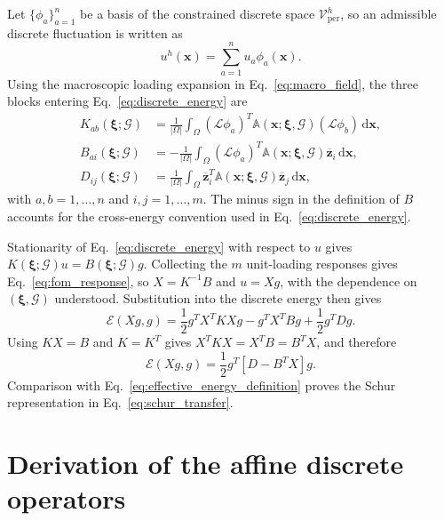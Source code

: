 \documentclass[pdflatex,sn-basic,Numbered]{sn-jnl}
\newcommand{\G}{\mathcal{G}}
\begin{document}
Let \(\{\phi_a\}_{a=1}^{n}\) be a basis of the constrained discrete space
\(\mathcal V_{\mathrm{per}}^h\), so an admissible discrete fluctuation is
written as
\[
u^h(\boldsymbol x)
=
\sum_{a=1}^{n}u_a\phi_a(\boldsymbol x).
\]
Using the macroscopic loading expansion in Eq.~\eqref{eq:macro_field}, the
three blocks entering Eq.~\eqref{eq:discrete_energy} are
\begin{align*}
K_{ab}(\boldsymbol\xi;\G)
&=
\frac{1}{|\Omega|}
\int_{\Omega}
(\mathcal L\phi_a)^T
\mathbb A(\boldsymbol x;\boldsymbol\xi,\G)
(\mathcal L\phi_b)
\,\mathrm d\boldsymbol x,
\\
B_{ai}(\boldsymbol\xi;\G)
&=
-
\frac{1}{|\Omega|}
\int_{\Omega}
(\mathcal L\phi_a)^T
\mathbb A(\boldsymbol x;\boldsymbol\xi,\G)
\overline{\boldsymbol z}_i
\,\mathrm d\boldsymbol x,
\\
D_{ij}(\boldsymbol\xi;\G)
&=
\frac{1}{|\Omega|}
\int_{\Omega}
\overline{\boldsymbol z}_i^T
\mathbb A(\boldsymbol x;\boldsymbol\xi,\G)
\overline{\boldsymbol z}_j
\,\mathrm d\boldsymbol x,
\end{align*}
with \(a,b=1,\ldots,n\) and \(i,j=1,\ldots,m\). The minus sign in the
definition of \(B\) accounts for the cross-energy convention used in
Eq.~\eqref{eq:discrete_energy}.

Stationarity of Eq.~\eqref{eq:discrete_energy} with respect to \(u\) gives
\(K(\boldsymbol\xi;\G)u=B(\boldsymbol\xi;\G)g\). Collecting the \(m\)
unit-loading responses gives Eq.~\eqref{eq:fom_response}, so
\(X=K^{-1}B\) and \(u=Xg\), with the dependence on
\((\boldsymbol\xi,\G)\) understood. Substitution into the discrete energy
then gives
\[
\mathcal E(Xg,g)
=
\frac{1}{2}g^TX^TKXg
-
g^TX^TBg
+
\frac{1}{2}g^TDg.
\]
Using \(KX=B\) and \(K=K^T\) gives
\(X^TKX=X^TB=B^TX\), and therefore
\[
\mathcal E(Xg,g)
=
\frac{1}{2}
g^T
\left[
D-B^TX
\right]
g.
\]
Comparison with Eq.~\eqref{eq:effective_energy_definition} proves the Schur
representation in Eq.~\eqref{eq:schur_transfer}.

\section{Derivation of the affine discrete operators}
\label{app:affine_discrete_derivation}
\end{document}
